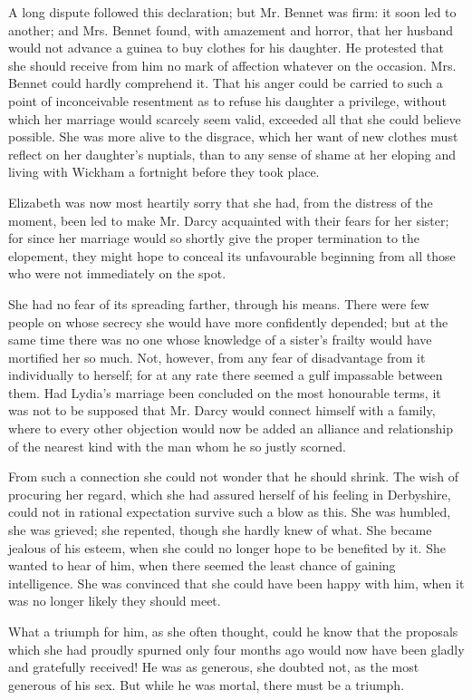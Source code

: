 \documentclass[12pt,openright]{book}
\begin{document}
A long dispute followed this declaration; but Mr. Bennet was firm: it soon led to another; and Mrs. Bennet found, with amazement and horror, that her husband would not advance a guinea to buy clothes for his daughter. He protested that she should receive from him no mark of affection whatever on the occasion. Mrs. Bennet could hardly comprehend it. That his anger could be carried to such a point of inconceivable resentment as to refuse his daughter a privilege, without which her marriage would scarcely seem valid, exceeded all that she could believe possible. She was more alive to the disgrace, which her want of new clothes must reflect on her daughter’s nuptials, than to any sense of shame at her eloping and living with Wickham a fortnight before they took place.

Elizabeth was now most heartily sorry that she had, from the distress of the moment, been led to make Mr. Darcy acquainted with their fears for her sister; for since her marriage would so shortly give the proper termination to the elopement, they might hope to conceal its unfavourable beginning from all those who were not immediately on the spot.

She had no fear of its spreading farther, through his means. There were few people on whose secrecy she would have more confidently depended; but at the same time there was no one whose knowledge of a sister’s frailty would have mortified her so much. Not, however, from any fear of disadvantage from it individually to herself; for at any rate there seemed a gulf impassable between them. Had Lydia’s marriage been concluded on the most honourable terms, it was not to be supposed that Mr. Darcy would connect himself with a family, where to every other objection would now be added an alliance and relationship of the nearest kind with the man whom he so justly scorned.

From such a connection she could not wonder that he should shrink. The wish of procuring her regard, which she had assured herself of his feeling in Derbyshire, could not in rational expectation survive such a blow as this. She was humbled, she was grieved; she repented, though she hardly knew of what. She became jealous of his esteem, when she could no longer hope to be benefited by it. She wanted to hear of him, when there seemed the least chance of gaining intelligence. She was convinced that she could have been happy with him, when it was no longer likely they should meet.

What a triumph for him, as she often thought, could he know that the proposals which she had proudly spurned only four months ago would now have been gladly and gratefully received! He was as generous, she doubted not, as the most generous of his sex. But while he was mortal, there must be a triumph.
\end{document}
